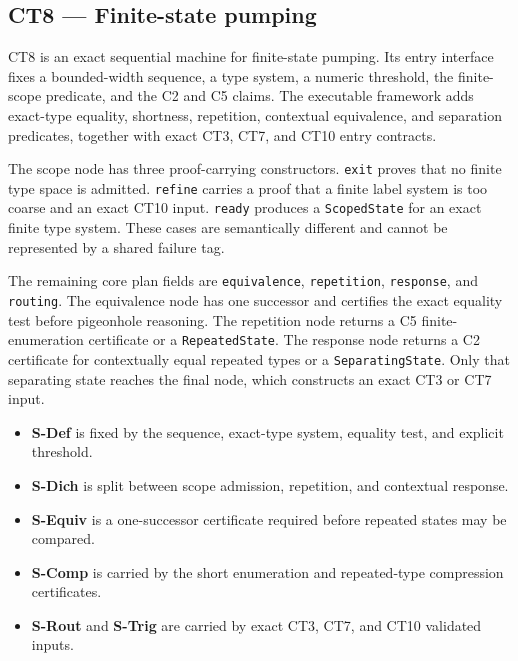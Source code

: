 \subsection{CT8 --- Finite-state pumping}\label{ct:8}\label{the-finite-state-pumping-principle}

CT8 is an exact sequential machine for finite-state pumping.  Its entry
interface fixes a bounded-width sequence, a type system, a numeric threshold,
the finite-scope predicate, and the C2 and C5 claims.  The executable framework
adds exact-type equality, shortness, repetition, contextual equivalence, and
separation predicates, together with exact CT3, CT7, and CT10 entry contracts.

The scope node has three proof-carrying constructors.  \texttt{exit} proves
that no finite type space is admitted.  \texttt{refine} carries a proof that a
finite label system is too coarse and an exact CT10 input.  \texttt{ready}
produces a \texttt{ScopedState} for an exact finite type system.  These cases
are semantically different and cannot be represented by a shared failure tag.

The remaining core plan fields are \texttt{equivalence},
\texttt{repetition}, \texttt{response}, and \texttt{routing}.  The
equivalence node has one successor and certifies the exact equality test before
pigeonhole reasoning.  The repetition node returns a C5 finite-enumeration
certificate or a \texttt{RepeatedState}.  The response node returns a C2
certificate for contextually equal repeated types or a
\texttt{SeparatingState}.  Only that separating state reaches the final node,
which constructs an exact CT3 or CT7 input.

\begin{itemize}
\tightlist
\item \textbf{S-Def} is fixed by the sequence, exact-type system, equality test, and explicit threshold.
\item \textbf{S-Dich} is split between scope admission, repetition, and contextual response.
\item \textbf{S-Equiv} is a one-successor certificate required before repeated states may be compared.
\item \textbf{S-Comp} is carried by the short enumeration and repeated-type compression certificates.
\item \textbf{S-Rout} and \textbf{S-Trig} are carried by exact CT3, CT7, and CT10 validated inputs.
\end{itemize}


